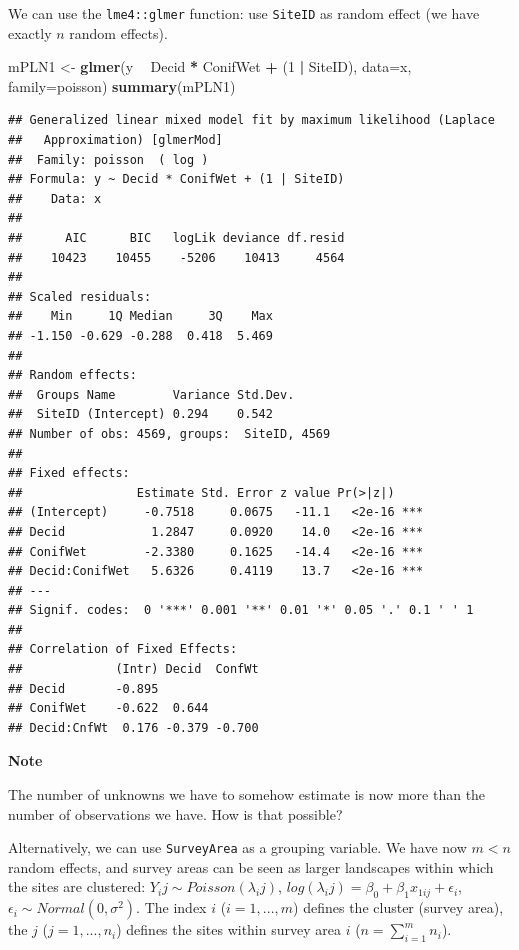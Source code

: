 \documentclass[12pt,]{book}
\newenvironment{Shaded}{\begin{snugshade}}{\end{snugshade}}
\newcommand{\DataTypeTok}[1]{\textcolor[rgb]{0.13,0.29,0.53}{#1}}
\newcommand{\DecValTok}[1]{\textcolor[rgb]{0.00,0.00,0.81}{#1}}
\newcommand{\KeywordTok}[1]{\textcolor[rgb]{0.13,0.29,0.53}{\textbf{#1}}}
\newcommand{\NormalTok}[1]{#1}
\newcommand{\OperatorTok}[1]{\textcolor[rgb]{0.81,0.36,0.00}{\textbf{#1}}}
\newcommand{\StringTok}[1]{\textcolor[rgb]{0.31,0.60,0.02}{#1}}
\let\BeginKnitrBlock\begin \let\EndKnitrBlock\end
\begin{document}
We can use the \texttt{lme4::glmer} function: use \texttt{SiteID} as random effect
(we have exactly \(n\) random effects).

\begin{Shaded}
\begin{Highlighting}[]
\NormalTok{mPLN1 <-}\StringTok{ }\KeywordTok{glmer}\NormalTok{(y }\OperatorTok{~}\StringTok{ }\NormalTok{Decid }\OperatorTok{*}\StringTok{ }\NormalTok{ConifWet }\OperatorTok{+}\StringTok{ }\NormalTok{(}\DecValTok{1} \OperatorTok{|}\StringTok{ }\NormalTok{SiteID), }\DataTypeTok{data=}\NormalTok{x, }\DataTypeTok{family=}\NormalTok{poisson)}
\KeywordTok{summary}\NormalTok{(mPLN1)}
\end{Highlighting}
\end{Shaded}

\begin{verbatim}
## Generalized linear mixed model fit by maximum likelihood (Laplace
##   Approximation) [glmerMod]
##  Family: poisson  ( log )
## Formula: y ~ Decid * ConifWet + (1 | SiteID)
##    Data: x
## 
##      AIC      BIC   logLik deviance df.resid 
##    10423    10455    -5206    10413     4564 
## 
## Scaled residuals: 
##    Min     1Q Median     3Q    Max 
## -1.150 -0.629 -0.288  0.418  5.469 
## 
## Random effects:
##  Groups Name        Variance Std.Dev.
##  SiteID (Intercept) 0.294    0.542   
## Number of obs: 4569, groups:  SiteID, 4569
## 
## Fixed effects:
##                Estimate Std. Error z value Pr(>|z|)    
## (Intercept)     -0.7518     0.0675   -11.1   <2e-16 ***
## Decid            1.2847     0.0920    14.0   <2e-16 ***
## ConifWet        -2.3380     0.1625   -14.4   <2e-16 ***
## Decid:ConifWet   5.6326     0.4119    13.7   <2e-16 ***
## ---
## Signif. codes:  0 '***' 0.001 '**' 0.01 '*' 0.05 '.' 0.1 ' ' 1
## 
## Correlation of Fixed Effects:
##             (Intr) Decid  ConfWt
## Decid       -0.895              
## ConifWet    -0.622  0.644       
## Decid:CnfWt  0.176 -0.379 -0.700
\end{verbatim}

\BeginKnitrBlock{rmdnote}
\textbf{Note}

The number of unknowns we have to somehow estimate is now more than the number of observations we have. How is that possible?
\EndKnitrBlock{rmdnote}

Alternatively, we can use \texttt{SurveyArea} as a grouping variable.
We have now \(m < n\) random effects, and survey areas can be seen
as larger landscapes within which the sites are clustered:
\(Y_ij\sim Poisson(\lambda_ij)\),
\(log(\lambda_ij) = \beta_0+\beta_1 x_{1ij}+\epsilon_i\),
\(\epsilon_i \sim Normal(0, \sigma^2)\).
The index \(i\) (\(i=1,...,m\)) defines the cluster (survey area),
the \(j\) (\(j=1,...,n_i\)) defines the sites within survey area \(i\)
(\(n = \sum_{i=1}^m n_i\)).
\end{document}
